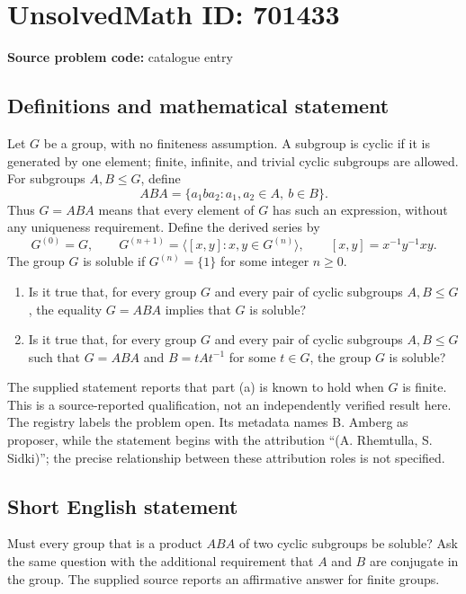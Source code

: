 \documentclass[11pt]{article}
\begin{document}
\section*{UnsolvedMath ID: 701433}
\textbf{Source problem code:} catalogue entry
\subsection{Definitions and mathematical statement}
Let \(G\) be a group, with no finiteness assumption. A subgroup is cyclic if it is generated by one element; finite, infinite, and trivial cyclic subgroups are allowed. For subgroups \(A,B\leq G\), define
\[
ABA=\{a_1ba_2:a_1,a_2\in A,\ b\in B\}.
\]
Thus \(G=ABA\) means that every element of \(G\) has such an expression, without any uniqueness requirement. Define the derived series by
\[
G^{(0)}=G,\qquad G^{(n+1)}=\langle [x,y]:x,y\in G^{(n)}\rangle,
\qquad [x,y]=x^{-1}y^{-1}xy.
\]
The group \(G\) is soluble if \(G^{(n)}=\{1\}\) for some integer \(n\geq0\).

\begin{enumerate}
\item[(a)] Is it true that, for every group \(G\) and every pair of cyclic subgroups \(A,B\leq G\), the equality \(G=ABA\) implies that \(G\) is soluble?
\item[(b)] Is it true that, for every group \(G\) and every pair of cyclic subgroups \(A,B\leq G\) such that \(G=ABA\) and \(B=tAt^{-1}\) for some \(t\in G\), the group \(G\) is soluble?
\end{enumerate}
The supplied statement reports that part (a) is known to hold when \(G\) is finite. This is a source-reported qualification, not an independently verified result here. The registry labels the problem open. Its metadata names B. Amberg as proposer, while the statement begins with the attribution ``(A. Rhemtulla, S. Sidki)''; the precise relationship between these attribution roles is not specified.
\subsection{Short English statement}
Must every group that is a product \(ABA\) of two cyclic subgroups be soluble? Ask the same question with the additional requirement that \(A\) and \(B\) are conjugate in the group. The supplied source reports an affirmative answer for finite groups.
\end{document}
